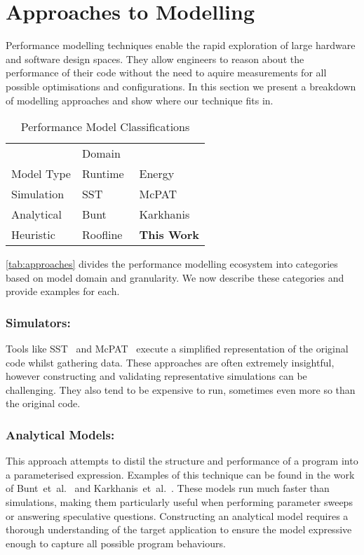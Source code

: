\section{Approaches to Modelling}
\label{sec:approaches}
Performance modelling techniques enable the rapid exploration of large hardware and software design spaces.
They allow engineers to reason about the performance of their code without the need to aquire measurements for all possible optimisations and configurations.
In this section we present a breakdown of modelling approaches and show where our technique fits in.

\begin{table}
  \centering
  \caption{Performance Model Classifications}
  \setlength{\tabcolsep}{10pt}
  \begin{tabular}{lll}
  \toprule
    & \multicolumn{2}{l}{Domain}\\ \cmidrule(){2-3}
  Model Type  & Runtime & Energy \\
    \midrule
  Simulation & SST~\cite{rodrigues:2011aa} & McPAT~\cite{li:2009aa}  \\
  Analytical & Bunt~\cite{bunt:2013aa} & Karkhanis~\cite{karkhanis:2007aa} \\
  Heuristic & Roofline~\cite{williams:2009aa} & \textbf{This Work} \\
  \bottomrule
  \end{tabular}
  \label{tab:approaches}
\end{table}

\autoref{tab:approaches} divides the performance modelling ecosystem into categories based on model domain and granularity.
We now describe these categories and provide examples for each.

\subsubsection{Simulators:} 
Tools like SST~\cite{rodrigues:2011aa} and McPAT~\cite{li:2009aa} execute a simplified representation of the original code whilst gathering data.
These approaches are often extremely insightful, however constructing and validating representative simulations can be challenging.
They also tend to be expensive to run, sometimes even more so than the original code.

\subsubsection{Analytical Models:} This approach attempts to distil the structure and performance of a program into a parameterised expression.
Examples of this technique can be found in the work of Bunt~et~al.~\cite{bunt:2013aa} and Karkhanis~et~al.~\cite{karkhanis:2007aa}.
These models run much faster than simulations, making them particularly useful when performing parameter sweeps or answering speculative questions.
Constructing an analytical model requires a thorough understanding of the target application to ensure the model expressive enough to capture all possible program behaviours.

